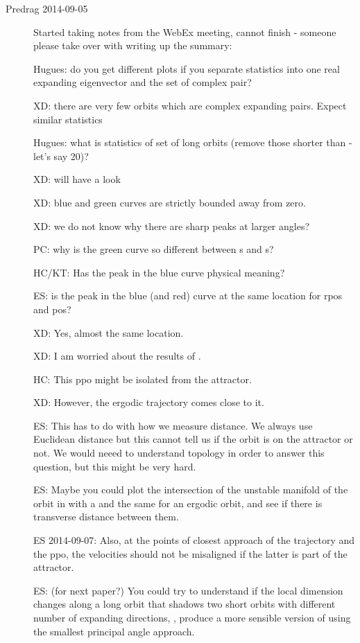 \begin{description}
\item[Predrag 2014-09-05]

Started taking notes from the WebEx meeting, cannot finish - someone
please take over with writing up the summary:

Hugues: do you get different plots if you separate statistics into
one real expanding eigenvector and the set of complex pair?

XD: there are very few orbits which are complex expanding pairs.
Expect similar statistics

Hugues: what is statistics of set of long orbits
(remove those shorter than - let's say 20)?

XD: will have a look

XD: blue and green curves are strictly bounded away from zero.

XD: we do not know why there are sharp peaks at larger angles?

PC: why is the green curve so different between \po s and \rpo s?

HC/KT: Has the peak in the blue curve physical meaning?

ES: is the peak in the blue (and red) curve at the same location for rpos and pos?

XD: Yes, almost the same location.

XD: I am worried about the results of .

HC: This ppo might be isolated from the attractor.

XD: However, the ergodic trajectory comes close to it.

ES: This has to do with how we measure distance. We always use Euclidean distance
but this cannot tell us if the orbit is on the attractor or not. We would neeed to
understand topology in order to answer this question, but this might be very hard.

ES: Maybe you could plot the intersection of the unstable manifold of
the orbit in  with a {\PoincSec} and
the same for an ergodic orbit, and see if there is transverse distance
between them.

ES 2014-09-07: Also, at the points of closest approach of the trajectory and the ppo,
the velocities should not be misaligned if the latter is part of the attractor.

ES: (for next paper?) You could try to understand if the local dimension changes
along a long orbit that shadows two short orbits with different number of expanding
directions, \ie, produce a more sensible version of  using
the smallest principal angle approach.


\end{description}
